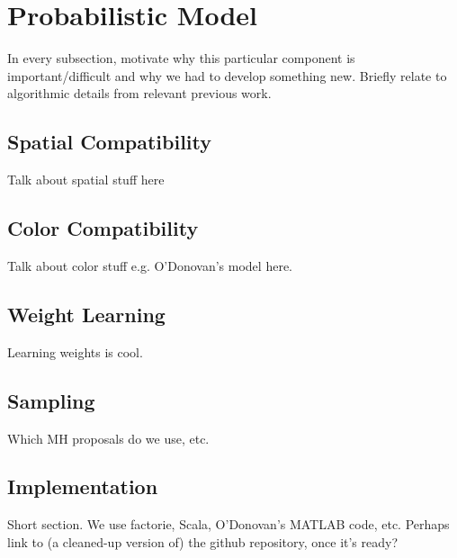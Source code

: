 \section{Probabilistic Model}
\label{sec:model}

In every subsection, motivate why this particular component is important/difficult and why we had to develop something new. Briefly relate to algorithmic details from relevant previous work.

\subsection{Spatial Compatibility}
\label{sec:spatialCompat}
Talk about spatial stuff here

\subsection{Color Compatibility}
\label{sec:colorCompat}
Talk about color stuff e.g. O'Donovan's model here.

\subsection{Weight Learning}
\label{sec:weights}
Learning weights is cool.

\subsection{Sampling}
\label{sec:sampling}
Which MH proposals do we use, etc.

\subsection{Implementation}
\label{sec:implementation}
Short section. We use factorie, Scala, O'Donovan's MATLAB code, etc. Perhaps link to (a cleaned-up version of) the github repository, once it's ready?